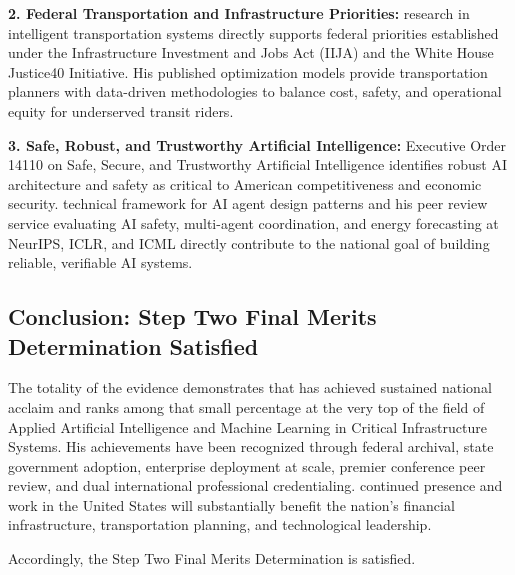 \textbf{2. Federal Transportation and Infrastructure Priorities:} \drs research in intelligent transportation systems directly supports federal priorities established under the Infrastructure Investment and Jobs Act (IIJA) and the White House Justice40 Initiative. His published optimization models provide transportation planners with data-driven methodologies to balance cost, safety, and operational equity for underserved transit riders.

\textbf{3. Safe, Robust, and Trustworthy Artificial Intelligence:} Executive Order 14110 on Safe, Secure, and Trustworthy Artificial Intelligence identifies robust AI architecture and safety as critical to American competitiveness and economic security. \drs technical framework for AI agent design patterns and his peer review service evaluating AI safety, multi-agent coordination, and energy forecasting at NeurIPS, ICLR, and ICML directly contribute to the national goal of building reliable, verifiable AI systems.

\subsection{Conclusion: Step Two Final Merits Determination Satisfied}
\label{finalmerits:conclusion}

The totality of the evidence demonstrates that \dr has achieved sustained national acclaim and ranks among that small percentage at the very top of the field of Applied Artificial Intelligence and Machine Learning in Critical Infrastructure Systems. His achievements have been recognized through federal archival, state government adoption, enterprise deployment at scale, premier conference peer review, and dual international professional credentialing. \drs continued presence and work in the United States will substantially benefit the nation's financial infrastructure, transportation planning, and technological leadership.

Accordingly, the Step Two Final Merits Determination is satisfied.
